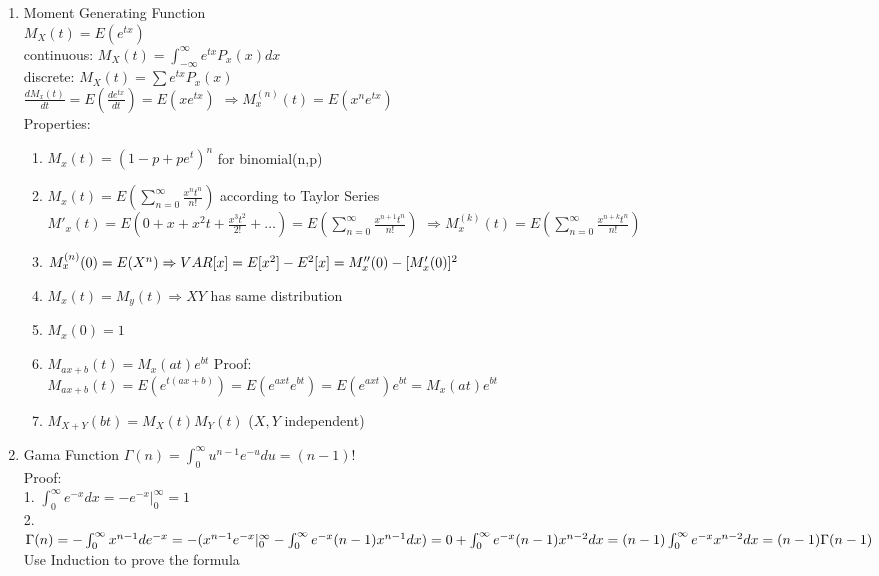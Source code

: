 \documentclass[10pt]{article}
\begin{document}
  
	\begin{multicols}{2}
		\begin{enumerate}
			\item Moment Generating Function\\
			$M_X(t) = E(e^{tx})$\\
			continuous: $M_X(t) = \int_{-\infty}^{\infty}e^{tx}P_x(x)dx$\\
			discrete: $M_X(t) = \sum e^{tx}P_x(x)$\\
			$\frac{dM_x(t)}{dt} = E(\frac{de^{tx}}{dt}) = E(xe^{tx})$
			$\Rightarrow M^{(n)}_x(t) = E(x^ne^{tx})$\\
			Properties:
			\begin{enumerate}
				\item $M_x(t) = (1-p+pe^t)^n$ for binomial(n,p)
				\item $M_x(t) = E(\sum_{n=0}^{\infty}\frac{x^nt^n}{n!})$ according to Taylor Series\\
				$M'_x(t) = E(0+x+x^2t + \frac{x^3t^2}{2!} + \dots) = E(\sum_{n=0}^{\infty}\frac{x^{n+1}t^n}{n!})$
				$\Rightarrow M^{(k)}_x(t) = E(\sum_{n=0}^{\infty}\frac{x^{n+k}t^n}{n!})$
				\item $M_x^{(n)}(0) = E(X^n) \\ \Rightarrow VAR[x]=E[x^2] - E^2[x] = M_x''(0) - [M_x'(0)]^2 $
				\item $M_x(t) = M_y(t) \Rightarrow X Y$ has same distribution
				\item $M_x(0) = 1$
				\item $M_{ax + b}(t) = M_x(at)e^{bt}$   Proof:\\ $M_{ax+b}(t) = E(e^{t(ax+b)}) = E(e^{axt}e^{bt}) = E(e^{axt})e^{bt} = M_x(at)e^{bt}$
				\item $M_{X+Y}(bt) = M_X(t)M_Y(t)$ ($X,Y$ independent)
			\end{enumerate}
		
			\item Gama Function
			$\Gamma(n) = \int_{0}^{\infty}u^{n-1}e^{-u}du = (n-1)!$\\
			Proof:\\
			1. $\int_{0}^{\infty}e^{-x}dx = -e^{-x}|_0^{\infty} = 1$\\
			2. $\Gamma(n) = -\int_{0}^{\infty}x^{n-1}de^{-x}\\
			= - (x^{n-1}e^{-x}|_0^{\infty} - \int_{0}^{\infty}e^{-x}(n-1)x^{n-1}dx)\\
			= 0 + \int_{0}^{\infty}e^{-x}(n-1)x^{n-2}dx\\
			= (n-1)\int_{0}^{\infty}e^{-x}x^{n-2}dx\\
			= (n-1)\Gamma(n-1)$\\
			Use Induction to prove the formula
			

\end{enumerate}
\end{multicols}
\end{document}
